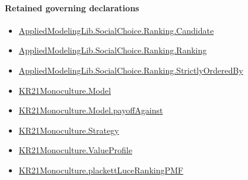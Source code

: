 \documentclass[10pt]{article}
\begin{document}
\paragraph{Retained governing declarations}
\begin{itemize}\raggedright
\item \hyperlink{library-prerequisite-8c0e6c25845ae78a}{Applied\allowbreak{}Modeling\allowbreak{}Lib.\allowbreak{}Social\allowbreak{}Choice.\allowbreak{}Ranking.\allowbreak{}Candidate}
\item \hyperlink{library-prerequisite-5cde54446d1ae021}{Applied\allowbreak{}Modeling\allowbreak{}Lib.\allowbreak{}Social\allowbreak{}Choice.\allowbreak{}Ranking.\allowbreak{}Ranking}
\item \hyperlink{library-prerequisite-3585717d1635654a}{Applied\allowbreak{}Modeling\allowbreak{}Lib.\allowbreak{}Social\allowbreak{}Choice.\allowbreak{}Ranking.\allowbreak{}Strictly\allowbreak{}Ordered\allowbreak{}By}
\item \hyperlink{paper-prerequisite-44d0acfebf827846}{KR21\allowbreak{}Monoculture.\allowbreak{}Model}
\item \hyperlink{governing-declaration-d917035875b2df44}{KR21\allowbreak{}Monoculture.\allowbreak{}Model.\allowbreak{}payoff\allowbreak{}Against}
\item \hyperlink{paper-prerequisite-b00425a844bd2ddf}{KR21\allowbreak{}Monoculture.\allowbreak{}Strategy}
\item \hyperlink{paper-prerequisite-c0e41e9b0e843969}{KR21\allowbreak{}Monoculture.\allowbreak{}Value\allowbreak{}Profile}
\item \hyperlink{governing-declaration-225190cf7c1bca37}{KR21\allowbreak{}Monoculture.\allowbreak{}plackett\allowbreak{}Luce\allowbreak{}Ranking\allowbreak{}PMF}
\end{itemize}
\end{document}
